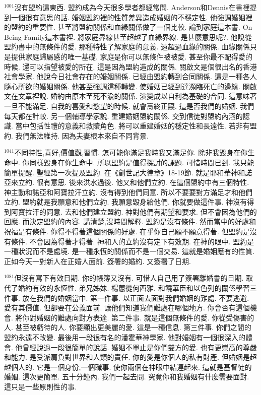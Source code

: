 \documentclass{book}
\begin{document}
$^{1001}$沒有盟約這東西.
盟約成為今天很多學者都經常問.
Anderson和Dennis在書裡提到一個很有意思的話.
婚姻盟約裡的性質差異造成婚姻的不穩定性.
他強調婚姻裡的盟約的重要性.
甚至將盟約關係和血緣關係做了一個比較.
論到家庭這本書.
On Being Family這本書裡.
將家庭界線甚至超越了血緣界線.
是甚麼意思呢?.
他說從盟約書中的無條件的愛.
那種特性了解家庭的意義.
遠超過血緣的關係.
血緣關係只是提供家庭歸屬感的唯一基礎.
家庭是你可以無條件被被愛.
甚至你最不配得愛的時候.
還可以指望被愛的所在.
這是因為盟約造成的關係.
關啟文是個很出名的香港社會學家.
他說今日社會存在的婚姻關係.
已經由盟約轉到合同關係.
這是一種各人隨心所欲的婚姻關係.
他甚至強調這種轉變.
使婚姻已經到達瀕臨死亡的邊緣.
關啟文在文章裡說.
婚約由原本至死不渝的關係.
演變成以自利為基礎的合同.
這意味著一旦不能滿足.
自我的喜愛和慾望的時候.
就會壽終正寢.
這是否我們的婚姻.
我們每天都在計較.
另一個輔導學家說.
重建婚姻盟約關係.
交到信徒對盟約內涵的認識.
當中包括性禮的意義和救贖角色.
將可以重建婚姻的穩定性和長遠性.
若非有盟約.
我們無法維持.
因為夫妻根本來自不同背景.

$^{1041}$不同特性,喜好,價值觀,習慣.
怎可能你滿足我時我又滿足你.
除非我毀身在你生命中.
你同樣毀身在你生命中.
所以盟約是值得探討的課題.
可惜時間已到.
我只能簡單提醒.
聖經第一次提及盟約.
在《創世記大律章》18-19節.
就是耶和華神和諾亞來立約.
很有意思.
後來洪水過後.
他又和他們立約.
在這個盟約中有三個特性.
神主動和諾亞和阿寶拉汗立約.
沒有得到他們同意.
所以不要要對方滿足才和他們立約.
盟約就是我願意和他們立約.
我願意毀身給他們.
你就要做這件事.
神沒有得到阿寶拉汗的同意.
去和他們建立盟約.
神對他們有期望和要求.
但不會因為他們的回應.
而決定盟約的內容.
講清楚,沒時間解釋.
盟約是沒有條件.
然而當中的好處和祝福是有條件.
你得不得著這個關係的好處.
在乎你自己願不願意得著.
但盟約是沒有條件.
不會因為得著才得著.
神和人的立約沒有定下有效期.
在神的眼中.
盟約是一種狀況而不是處境.
是一種永恆的關係而不是一個交易.
這就是婚姻應有的性質.
正如今天一對新人在正婚人面前.
簽署的婚約.
又簽署了日期.

$^{1081}$但沒有寫下有效日期.
你的帳簿又沒有.
可惜人自己用了簽署離婚書的日期.
取代了婚約有效的永恆性.
弟兄姊妹.
楊蕙從何西雅.
和饒華臣和以色列的關係學習三件事.
放在我們的婚姻當中.
第一件事.
以正面去面對我們婚姻的難處.
不要逃避.
愛有其價值.
但卻要在公義面前.
讓他們知道我們難處在哪個地方.
你會否有這個機會.
將你對婚姻的難處向對方表達.
第二件事.
就是這個無條件的愛.
你從受傷害的人.
甚至被虧待的人.
你要顯出更美麗的愛.
這是一種信息.
第三件事.
你們之間的盟約永遠不改變.
最後用一段很有名的潘霍華神學家.
他對婚姻有一個很深入的體會.
他曾經說過一段很簡單的說話.
婚姻不單止是你們雙方的愛.
也有更崇高的尊嚴和能力.
是受派肩負對世界和人類的責任.
你的愛是你個人的私有財產.
但婚姻是超越個人的.
它是一個身份,一個職事.
使你兩個在神眼中結連起來.
這就是基督徒的婚姻.
這次更簡單.
五十分鐘內.
我們一起去問.
究竟你和我婚姻有什麼需要面對.
這只是一些原則性的事.
\end{document}
